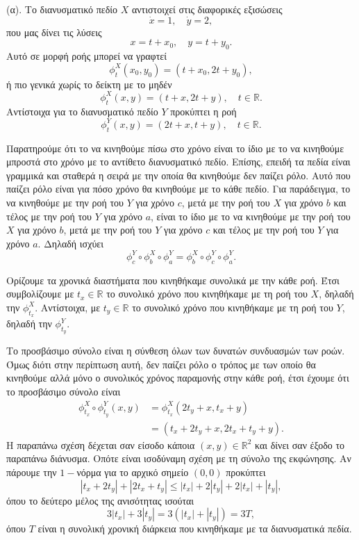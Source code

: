 \begin{solution}
    (α). Το διανυσματικό πεδίο \( X \) αντιστοιχεί στις διαφορικές εξισώσεις
    \[
        \dot{x} = 1, \quad \dot{y} = 2,
    \]
    που μας δίνει τις λύσεις
    \[
        x = t + x_0, \quad y = t + y_0.
    \]
    Αυτό σε μορφή ροής μπορεί να γραφτεί
    \[
        \phi^X_t(x_0, y_0) = (t + x_0, 2t + y_0),
    \]
    ή πιο γενικά χωρίς το δείκτη με το μηδέν
    \[
        \phi^X_t(x, y) = (t + x, 2t + y), \quad t \in \mathbb{R}.
    \]
    Αντίστοιχα για το διανυσματικό πεδίο \( Y \) προκύπτει η ροή
    \[
        \phi^Y_t(x, y) = (2t + x, t + y), \quad t \in \mathbb{R}.
    \]

    Παρατηρούμε ότι το να κινηθούμε πίσω στο χρόνο είναι το ίδιο με το να
    κινηθούμε μπροστά στο χρόνο με το αντίθετο διανυσματικό πεδίο. Επίσης,
    επειδή τα πεδία είναι γραμμικά και σταθερά η σειρά με την οποία θα κινηθούμε
    δεν παίζει ρόλο. Αυτό που παίζει ρόλο είναι για πόσο χρόνο θα κινηθούμε με το
    κάθε πεδίο. Για παράδειγμα, το να κινηθούμε με την ροή του \( Y \) για χρόνο
    \( c \), μετά με την ροή του \( X \) για χρόνο \( b \) και τέλος με την
    ροή του \( Y \) για χρόνο \( a \), είναι το ίδιο με το να κινηθούμε με την
    ροή του \( X \) για χρόνο \( b \), μετά με την ροή του \( Y \) για χρόνο
    \( c \) και τέλος με την ροή του \( Y \) για χρόνο \( a \). Δηλαδή
    ισχύει
    \[
        \phi^Y_{c} \circ \phi^X_{b} \circ \phi^Y_{a} =
        \phi^X_{b} \circ \phi^Y_{c} \circ \phi^Y_{a}.
    \]

    Ορίζουμε τα χρονικά διαστήματα που κινηθήκαμε συνολικά με την κάθε ροή.
    Έτσι συμβολίζουμε με \( t_x \in \mathbb{R} \) το συνολικό χρόνο που
    κινηθήκαμε με τη ροή του \( X \), δηλαδή την \( \phi^{X}_{t_x} \).
    Αντίστοιχα, με \( t_y \in \mathbb{R} \) το συνολικό χρόνο που κινηθήκαμε
    με τη ροή του \( Y \), δηλαδή την \( \phi^{Y}_{t_y} \).

    Το προσβάσιμο σύνολο είναι η σύνθεση όλων των δυνατών συνδυασμών των ροών.
    Όμως διότι στην περίπτωση αυτή, δεν παίζει ρόλο ο τρόπος με των οποίο θα
    κινηθούμε αλλά μόνο ο συνολικός χρόνος παραμονής στην κάθε ροή, έτσι έχουμε
    ότι το προσβάσιμο σύνολο είναι
    \begin{align}\label{eq:ex8_flow}
        \phi^X_{t_x} \circ \phi^Y_{t_y} (x, y) &=
        \phi^X_{t_x} (2t_y + x, t_x + y) \nonumber \\
        &= (t_x + 2t_y + x, 2t_x + t_y + y).
    \end{align}
    Η παραπάνω σχέση δέχεται σαν είσοδο κάποια \( (x, y) \in \mathbb{R}^2 \) και
    δίνει σαν έξοδο το παραπάνω διάνυσμα. Οπότε είναι ισοδύναμη σχέση με τη
    σύνολο της εκφώνησης. Αν πάρουμε την \(1-\)νόρμα για το αρχικό σημείο
    \( (0, 0) \) προκύπτει
    \[
        |t_x + 2t_y| + |2t_x + t_y| \leq |t_x| + 2|t_y|  + 2|t_x| + |t_y|,
    \]
    όπου το δεύτερο μέλος της ανισότητας ισούται
    \[
        3|t_x| + 3|t_y| = 3(|t_x| + |t_y|) = 3T,
    \]
    όπου \( T \) είναι η συνολική χρονική διάρκεια που κινηθήκαμε με τα διανυσματικά πεδία.


\end{solution}
